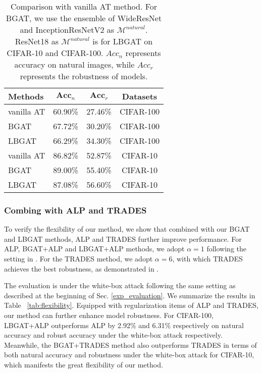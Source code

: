 \documentclass[10pt,twocolumn,letterpaper]{article}
\begin{document}
\begin{table}[t!]
	\centering
	\caption{Comparison with vanilla AT method. For BGAT, we use the ensemble of WideResNet and InceptionResNetV2 as $\mathcal{M}^{natural}$. ResNet18 as $\mathcal{M}^{natural}$ is for LBGAT on CIFAR-10 and CIFAR-100. $Acc_{n}$ represents accuracy on natural images, while $Acc_{r}$ represents the robustness of models.} 
	\resizebox{0.80\linewidth}{!}
	{
	\begin{tabular}{l|c|c|c}
		\textbf{Methods} &$\textbf{Acc}_{n}$ &$\textbf{Acc}_{r}$ &\textbf{Datasets} \\
		\hline
		\hline
		vanilla AT  &60.90\% &27.46\%  &CIFAR-100 \\
		BGAT        &67.72\% &30.20\%  &CIFAR-100 \\
		LBGAT       &66.29\% &34.30\%  &CIFAR-100 \\
		\hline
		vanilla AT  &86.82\% &52.87\%  &CIFAR-10 \\
		BGAT        &89.00\% &55.40\%  &CIFAR-10 \\
		LBGAT       &87.08\% &56.60\%  &CIFAR-10 \\
		\hline
	\end{tabular}
    }
	\label{tab:effectiveness}
\end{table}

\subsubsection{Combing with ALP and TRADES}
\label{exp_flexibility}
To verify the flexibility of our method, we show that combined with our BGAT and LBGAT methods, ALP and TRADES further improve performance. For ALP, BGAT+ALP and LBGAT+ALP methods, we adopt $\alpha=1$ following the setting in \cite{DBLP:journals/corr/abs-1803-06373}. For the TRADES method, we adopt $\alpha=6$, with which TRADES achieves the best robustness, as demonstrated in \cite{zhang2019theoretically}.

The evaluation is under the white-box attack following the same setting as described at the beginning of Sec. \ref{exp_evaluation}.
We summarize the results in Table ~\ref{tab:flexibility}. Equipped with regularization items of ALP and TRADES, our method can further enhance model robustness. For CIFAR-100, LBGAT+ALP outperforms ALP by 2.92\% and 6.31\% respectively on natural accuracy and robust accuracy under the white-box attack respectively. Meanwhile, the BGAT+TRADES method also outperforms TRADES in terms of both natural accuracy and robustness under the white-box attack for CIFAR-10, which manifests the great flexibility of our method. 
\end{document}
